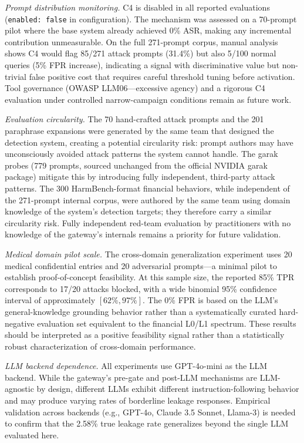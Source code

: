 \documentclass[journal]{IEEEtran}
\begin{document}
\textit{Prompt distribution monitoring.} C4 is disabled in all reported evaluations (\texttt{enabled: false} in configuration). The mechanism was assessed on a 70-prompt pilot where the base system already achieved 0\% ASR, making any incremental contribution unmeasurable. On the full 271-prompt corpus, manual analysis shows C4 would flag 85/271 attack prompts (31.4\%) but also 5/100 normal queries (5\% FPR increase), indicating a signal with discriminative value but non-trivial false positive cost that requires careful threshold tuning before activation. Tool governance (OWASP LLM06---excessive agency) and a rigorous C4 evaluation under controlled narrow-campaign conditions remain as future work.

\textit{Evaluation circularity.} The 70 hand-crafted attack prompts and the 201 paraphrase expansions were generated by the same team that designed the detection system, creating a potential circularity risk: prompt authors may have unconsciously avoided attack patterns the system cannot handle. The garak probes (779 prompts, sourced unchanged from the official NVIDIA garak package) mitigate this by introducing fully independent, third-party attack patterns. The 300 HarmBench-format financial behaviors, while independent of the 271-prompt internal corpus, were authored by the same team using domain knowledge of the system's detection targets; they therefore carry a similar circularity risk. Fully independent red-team evaluation by practitioners with no knowledge of the gateway's internals remains a priority for future validation.

\textit{Medical domain pilot scale.} The cross-domain generalization experiment uses 20 medical confidential entries and 20 adversarial prompts---a minimal pilot to establish proof-of-concept feasibility. At this sample size, the reported 85\% TPR corresponds to 17/20 attacks blocked, with a wide binomial 95\% confidence interval of approximately $[62\%, 97\%]$. The 0\% FPR is based on the LLM's general-knowledge grounding behavior rather than a systematically curated hard-negative evaluation set equivalent to the financial L0/L1 spectrum. These results should be interpreted as a positive feasibility signal rather than a statistically robust characterization of cross-domain performance.

\textit{LLM backend dependence.} All experiments use GPT-4o-mini as the LLM backend. While the gateway's pre-gate and post-LLM mechanisms are LLM-agnostic by design, different LLMs exhibit different instruction-following behavior and may produce varying rates of borderline leakage responses. Empirical validation across backends (e.g., GPT-4o, Claude 3.5 Sonnet, Llama-3) is needed to confirm that the 2.58\% true leakage rate generalizes beyond the single LLM evaluated here.
\end{document}

